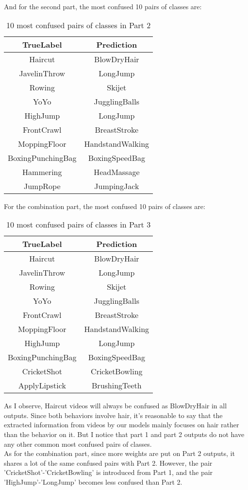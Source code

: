 \documentclass[15pt]{article}
\begin{document}
And for the second part, the most confused 10 pairs of classes are:\\
\begin{table}[!hbp]
\begin{center}
\begin{tabular}{c|c}
TrueLabel & Prediction \\
\hline
Haircut & BlowDryHair \\
JavelinThrow & LongJump \\
Rowing & Skijet \\
YoYo & JugglingBalls \\
HighJump & LongJump \\
FrontCrawl & BreastStroke \\
MoppingFloor & HandstandWalking \\
BoxingPunchingBag & BoxingSpeedBag \\
Hammering & HeadMassage \\
JumpRope & JumpingJack\\
\hline
\end{tabular}
\end{center}
\caption{10 most confused pairs of classes in Part 2}
\end{table}

For the combination part, the most confused 10 pairs of classes are:\\
\begin{table}[!hbp]
\begin{center}
\begin{tabular}{c|c}
TrueLabel & Prediction \\
\hline
Haircut & BlowDryHair \\
JavelinThrow & LongJump \\
Rowing & Skijet \\
YoYo & JugglingBalls \\
FrontCrawl & BreastStroke \\
MoppingFloor & HandstandWalking \\
HighJump & LongJump \\
BoxingPunchingBag & BoxingSpeedBag \\
CricketShot & CricketBowling \\
ApplyLipstick & BrushingTeeth\\
\hline
\end{tabular}
\end{center}
\caption{10 most confused pairs of classes in Part 3}
\end{table}

As I observe, Haircut videos will always be confused as BlowDryHair in all outputs. Since both behaviors involve hair, it's reasonable to say that the extracted information from videos by our models mainly focuses on hair rather than the behavior on it. But I notice that part 1 and part 2 outputs do not have any other common most confused pairs of classes. \\
As for the combination part, since more weights are put on Part 2 outputs, it shares a lot of the same confused pairs with Part 2. However, the pair 'CricketShot'-'CricketBowling' is introduced from Part 1, and the pair 'HighJump'-'LongJump' becomes less confused than Part 2.
\end{document}
